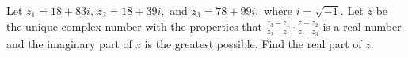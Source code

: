 Let $z_1 = 18 + 83i$,  $z_2 = 18 + 39i, $ and $z_3 = 78 + 99i,$ where $i = \sqrt{-1}$. Let $z$ be the unique complex number with the properties that $\frac{z_3 - z_1}{z_2 - z_1} \cdot \frac{z - z_2}{z - z_3}$ is a real number and the imaginary part of $z$ is the greatest possible. Find the real part of $z$.